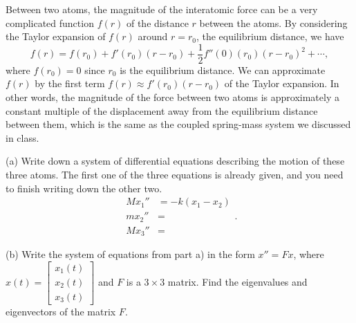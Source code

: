 \documentclass[11pt]{article}
\theoremstyle{definition}
\begin{document}
\begin{enumerate}[leftmargin=*]
\begin{center}
   \end{center}

Between two atoms, the magnitude of the interatomic force can be a very complicated function $f(r)$ of the distance $r$ between the atoms.  By considering the Taylor expansion of $f(r)$ around $r=r_0$, the equilibrium distance, we have 
\[
f(r)=f(r_0)+ f'(r_0)(r-r_0) + \frac{1}{2}f''(0)(r_0) (r-r_0)^2+\cdots,
\]
where $f(r_0)=0$ since $r_0$ is the equilibrium distance.  We can approximate $f(r)$ by the first term $f(r)\approx f'(r_0)(r-r_0)$ of the Taylor expansion.   In other words, the magnitude of the force between two atoms is approximately a constant multiple of the displacement away from the equilibrium distance between them, which is the same as the coupled spring-mass system we discussed in class.  

(a) Write down a system of differential equations describing the motion of these three atoms.  The first one of the three equations is already given, and you need to finish writing down the other two.  
\[
\begin{array} {cl}
Mx_1'' &= -k(x_1-x_2)\\
mx_2'' & =\\
Mx_3'' & = 
\end{array}.
\]

(b) Write the system of equations from part a) in the form $x''=Fx$, where $x(t)=\left[\begin{array}{l} x_1(t)\\x_2(t)\\ x_3(t)\end{array}\right]$ and $F$ is a $3\times 3$ matrix.  Find the eigenvalues and eigenvectors of the matrix $F$.\\





\end{enumerate}
\end{document}
